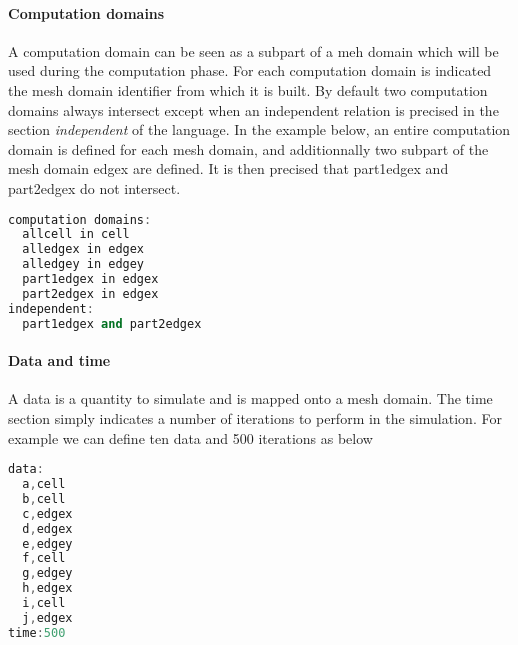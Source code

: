 \paragraph{Computation domains} A computation domain can be seen as a subpart of a meh domain which will be used during the computation phase. For each computation domain is indicated the mesh domain identifier from which it is built. By default two computation domains always intersect except when an independent relation is precised in the section \emph{independent} of the language. In the example below, an entire computation domain is defined for each mesh domain, and additionnally two subpart of the mesh domain edgex are defined. It is then precised that part1edgex and part2edgex do not intersect.
\begin{lstlisting}[basicstyle=\small,mathescape,frame=single,language=C++]
computation domains:
  allcell in cell
  alledgex in edgex
  alledgey in edgey
  part1edgex in edgex
  part2edgex in edgex
independent:
  part1edgex and part2edgex
\end{lstlisting}

\paragraph{Data and time} A data is a quantity to simulate and is mapped onto a mesh domain. The time section simply indicates a number of iterations to perform in the simulation. For example we can define ten data and 500 iterations as below
\begin{lstlisting}[basicstyle=\small,mathescape,frame=single,language=C++]
data:
  a,cell
  b,cell
  c,edgex
  d,edgex
  e,edgey
  f,cell
  g,edgey
  h,edgex
  i,cell
  j,edgex
time:500
\end{lstlisting}

